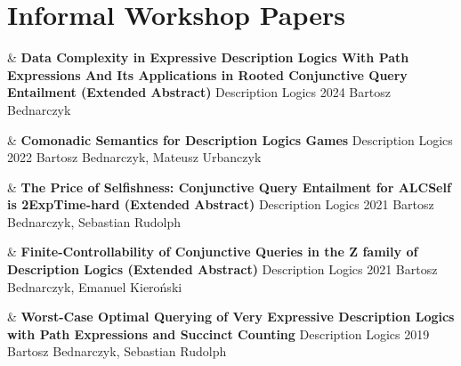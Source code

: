 \documentclass[10pt,a4paper]{article}
\begin{document}

\section{Informal Workshop Papers}

\begin{EntriesTableYear}
    &
    \textbf{Data Complexity in Expressive Description Logics With Path Expressions And Its Applications in Rooted Conjunctive Query Entailment (Extended Abstract)}
    \newline
    Description Logics 2024
    \newline
    Bartosz Bednarczyk
    \\
  \end{EntriesTableYear}

\begin{EntriesTableYear}
  &
  \textbf{Comonadic Semantics for Description Logics Games}
  \newline
  Description Logics 2022
  \newline
  Bartosz Bednarczyk, Mateusz Urbanczyk
  \\
\end{EntriesTableYear}

\begin{EntriesTableYear}
  &
  \textbf{The Price of Selfishness: Conjunctive Query Entailment for ALCSelf is 2ExpTime-hard (Extended Abstract)}
  \newline
  Description Logics 2021
  \newline
 Bartosz Bednarczyk, Sebastian Rudolph
  \\
\end{EntriesTableYear}

\begin{EntriesTableYear}
  &
  \textbf{Finite-Controllability of Conjunctive Queries in the Z family of Description Logics (Extended Abstract)}
  \newline
  Description Logics 2021
  \newline
 Bartosz Bednarczyk, Emanuel Kieroński
  \\
\end{EntriesTableYear}

\begin{EntriesTableYear}
  &
  \textbf{Worst-Case Optimal Querying of Very Expressive Description Logics with Path Expressions and Succinct Counting}
  \newline
  Description Logics 2019
  \newline
 Bartosz Bednarczyk, Sebastian Rudolph
  \\
\end{EntriesTableYear}
\end{document}

